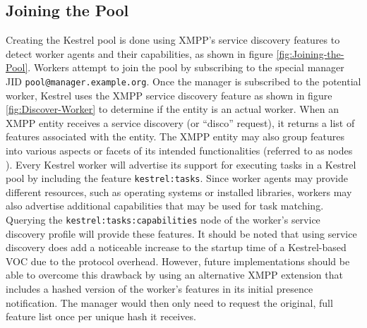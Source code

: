 \subsection{Joining the Pool}
Creating the Kestrel pool is done using XMPP's service discovery features
to detect worker agents and their capabilities, as shown in figure
\ref{fig:Joining-the-Pool}. Workers attempt to join the pool by subscribing
to the special manager JID \texttt{pool@manager.example.org}. Once the
manager is subscribed to the potential worker, Kestrel uses the XMPP service
discovery feature \cite{XEP-0030} as shown in figure \ref{fig:Discover-Worker}
to determine if the entity is an actual worker. When an XMPP entity receives
a service discovery (or ``disco'' request), it returns a list of features
associated with the entity. The XMPP entity may also group features into
various aspects or facets of its intended functionalities (referred to as nodes
\cite{XEP-0030}). Every Kestrel worker will advertise its support for executing
tasks in a Kestrel pool by including the feature \texttt{kestrel:tasks}. Since
worker agents may provide different resources, such as operating systems or
installed libraries, workers may also advertise additional capabilities that
may be used for task matching. Querying the \texttt{kestrel:tasks:capabilities}
node of the worker's service discovery profile will provide these features. It
should be noted that using service discovery does add a noticeable increase to
the startup time of a Kestrel-based VOC due to the protocol overhead. However,
future implementations should be able to overcome this drawback by using an
alternative XMPP extension \cite{XEP-0115} that includes a hashed version of the
worker's features in its initial presence notification. The manager would then
only need to request the original, full feature list once per unique hash it
receives.


